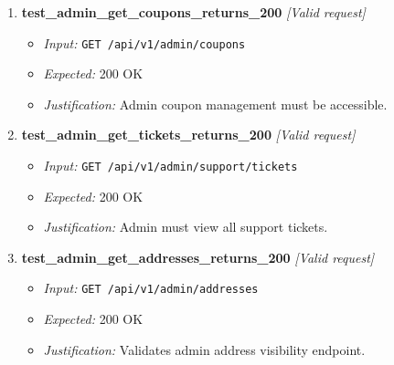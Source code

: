 \documentclass{article}
\begin{document}
\begin{enumerate}[resume, label=\textbf{TC\arabic*.}]
\item \textbf{test\_admin\_get\_coupons\_returns\_200} \textit{[Valid request]}
\begin{itemize}[noitemsep]
  \item \textit{Input:} \texttt{GET /api/v1/admin/coupons}
  \item \textit{Expected:} 200 OK
  \item \textit{Justification:} Admin coupon management must be accessible.
\end{itemize}

\item \textbf{test\_admin\_get\_tickets\_returns\_200} \textit{[Valid request]}
\begin{itemize}[noitemsep]
  \item \textit{Input:} \texttt{GET /api/v1/admin/support/tickets}
  \item \textit{Expected:} 200 OK
  \item \textit{Justification:} Admin must view all support tickets.
\end{itemize}

\item \textbf{test\_admin\_get\_addresses\_returns\_200} \textit{[Valid request]}
\begin{itemize}[noitemsep]
  \item \textit{Input:} \texttt{GET /api/v1/admin/addresses}
  \item \textit{Expected:} 200 OK
  \item \textit{Justification:} Validates admin address visibility endpoint.
\end{itemize}
\end{enumerate}
\end{document}
